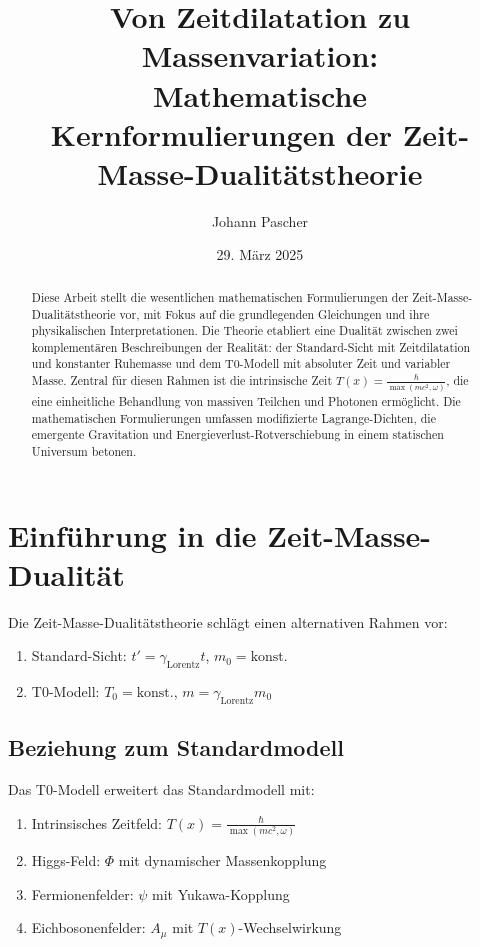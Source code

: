 \documentclass{article}
\title{Von Zeitdilatation zu Massenvariation: \\ Mathematische Kernformulierungen der Zeit-Masse-Dualitätstheorie}
\author{Johann Pascher}
\date{29. März 2025}
\newcommand{\Tfield}{T(x)}
\newcommand{\gammaf}{\gamma_{\text{Lorentz}}}
\begin{document}
	
	\maketitle
	
	\begin{abstract}
		Diese Arbeit stellt die wesentlichen mathematischen Formulierungen der Zeit-Masse-Dualitätstheorie vor, mit Fokus auf die grundlegenden Gleichungen und ihre physikalischen Interpretationen. Die Theorie etabliert eine Dualität zwischen zwei komplementären Beschreibungen der Realität: der Standard-Sicht mit Zeitdilatation und konstanter Ruhemasse und dem T0-Modell mit absoluter Zeit und variabler Masse. Zentral für diesen Rahmen ist die intrinsische Zeit \( \Tfield = \frac{\hbar}{\max(m c^2, \omega)} \), die eine einheitliche Behandlung von massiven Teilchen und Photonen ermöglicht. Die mathematischen Formulierungen umfassen modifizierte Lagrange-Dichten, die emergente Gravitation und Energieverlust-Rotverschiebung in einem statischen Universum betonen.
	\end{abstract}
	
	\tableofcontents
	\newpage
	
	\section{Einführung in die Zeit-Masse-Dualität}
	Die Zeit-Masse-Dualitätstheorie schlägt einen alternativen Rahmen vor:
	\begin{enumerate}
		\item Standard-Sicht: \( t' = \gammaf t \), \( m_0 = \text{konst.} \)
		\item T0-Modell: \( T_0 = \text{konst.} \), \( m = \gammaf m_0 \)
	\end{enumerate}
	
	\subsection{Beziehung zum Standardmodell}
	Das T0-Modell erweitert das Standardmodell mit:
	\begin{enumerate}
		\item Intrinsisches Zeitfeld: \( \Tfield = \frac{\hbar}{\max(m c^2, \omega)} \)
		\item Higgs-Feld: \( \Phi \) mit dynamischer Massenkopplung
		\item Fermionenfelder: \( \psi \) mit Yukawa-Kopplung
		\item Eichbosonenfelder: \( A_\mu \) mit \( \Tfield \)-Wechselwirkung
	\end{enumerate}
	
\end{document}
